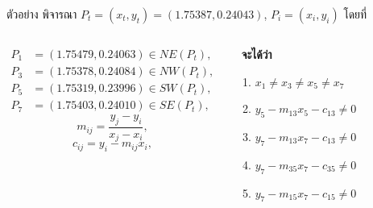 \documentclass[12pt,aspectratio=169]{beamer}
\begin{document}
\begin{frame}{ตัวอย่าง}
พิจารณา $P_t = (x_t,y_t) =  (1.75387, 0.24043)$, $P_i = (x_i, y_i)$ โดยที่
\begin{columns}
\begin{align*}
P_1 & = (1.75479, 0.24063) \in NE(P_t), \\ 
P_3 & = (1.75378, 0.24084) \in NW(P_t),\\
P_5 & = (1.75319, 0.23996) \in SW(P_t),\\
P_7 & = (1.75403, 0.24010)  \in SE(P_t), 
\end{align*}
\[m_{ij} = \dfrac{y_j-y_i}{x_j-x_i}, \]
\[c_{ij} = y_i - m_{ij}x_i,\]    
\begin{block}{}\
\textbf{จะได้ว่า} 
\begin{enumerate}
    \item $x_1 \neq x_3 \neq x_5 \neq x_7$
    \item $y_5 - m_{13}x_5 - c_{13} \neq 0$
    \item $y_7 - m_{13}x_7 - c_{13} \neq 0$
    \item $y_7 - m_{35}x_7 - c_{35} \neq 0$
    \item $y_7 - m_{15}x_7 - c_{15} \neq 0$
\end{enumerate}     
\end{block} 
\end{columns}


\end{frame}
\end{document}
